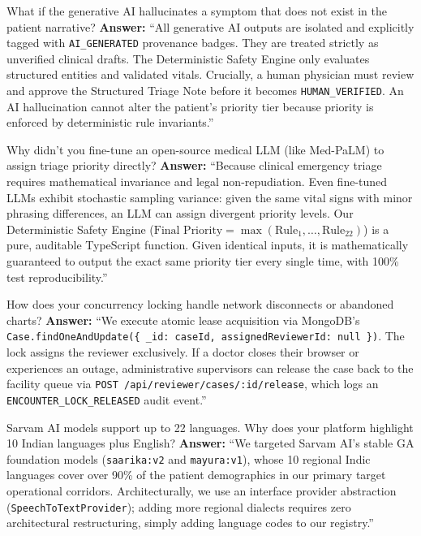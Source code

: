 \documentclass[11pt,a4paper]{article}
\begin{document}
\begin{qabox}{What if the generative AI hallucinates a symptom that does not exist in the patient narrative?}
\textbf{Answer:} ``All generative AI outputs are isolated and explicitly tagged with \texttt{AI\_GENERATED} provenance badges. They are treated strictly as unverified clinical drafts. The Deterministic Safety Engine only evaluates structured entities and validated vitals. Crucially, a human physician must review and approve the Structured Triage Note before it becomes \texttt{HUMAN\_VERIFIED}. An AI hallucination cannot alter the patient's priority tier because priority is enforced by deterministic rule invariants.''
\end{qabox}

\begin{qabox}{Why didn't you fine-tune an open-source medical LLM (like Med-PaLM) to assign triage priority directly?}
\textbf{Answer:} ``Because clinical emergency triage requires mathematical invariance and legal non-repudiation. Even fine-tuned LLMs exhibit stochastic sampling variance: given the same vital signs with minor phrasing differences, an LLM can assign divergent priority levels. Our Deterministic Safety Engine ($\text{Final Priority} = \max(\text{Rule}_1, \dots, \text{Rule}_{22})$) is a pure, auditable TypeScript function. Given identical inputs, it is mathematically guaranteed to output the exact same priority tier every single time, with 100\% test reproducibility.''
\end{qabox}

\begin{qabox}{How does your concurrency locking handle network disconnects or abandoned charts?}
\textbf{Answer:} ``We execute atomic lease acquisition via MongoDB's \texttt{Case.findOneAndUpdate(\{ \_id: caseId, assignedReviewerId: null \})}. The lock assigns the reviewer exclusively. If a doctor closes their browser or experiences an outage, administrative supervisors can release the case back to the facility queue via \texttt{POST /api/reviewer/cases/:id/release}, which logs an \texttt{ENCOUNTER\_LOCK\_RELEASED} audit event.''
\end{qabox}

\begin{qabox}{Sarvam AI models support up to 22 languages. Why does your platform highlight 10 Indian languages plus English?}
\textbf{Answer:} ``We targeted Sarvam AI's stable GA foundation models (\texttt{saarika:v2} and \texttt{mayura:v1}), whose 10 regional Indic languages cover over 90\% of the patient demographics in our primary target operational corridors. Architecturally, we use an interface provider abstraction (\texttt{SpeechToTextProvider}); adding more regional dialects requires zero architectural restructuring, simply adding language codes to our registry.''
\end{qabox}
\end{document}
